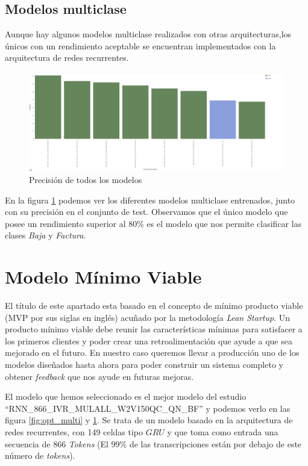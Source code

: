 \subsection{Modelos multiclase}

Aunque hay algunos modelos multiclase realizados con otras arquitecturas,los únicos con un rendimiento aceptable se encuentran implementados con la arquitectura de redes recurrentes.

\begin{figure}[!ht]
	\centering
	\includegraphics[width=1\textwidth]{images/super/resumen_multi}
	\caption{Precisión de todos los modelos}
	\label{fig:resumen_multi}
\end{figure}


En la figura \ref{fig:resumen_multi}  podemos ver los diferentes modelos multiclase entrenados, junto con su precisión en el conjunto de test. Observamos que el único modelo que posee un rendimiento superior al 80\% es el modelo que nos permite clasificar las clases \textit{Baja} y \textit{Factura}.


\section{Modelo Mínimo Viable}
\label{section:super:mvm}
El título de este apartado esta basado en el concepto de mínimo producto viable (MVP por sus siglas en inglés) acuñado por la metodología \textit{Lean Startup}. Un producto mínimo viable debe reunir las características mínimas para satisfacer a los primeros clientes y poder crear una retroalimentación que ayude a que sea mejorado en el futuro. En nuestro caso queremos llevar a producción uno de los modelos diseñados hasta ahora para poder construir un sistema completo y obtener \textit{feedback} que nos ayude en futuras mejoras.

El modelo que hemos seleccionado es el mejor modelo del estudio ``RNN\_866\_IVR\_MULALL\_W2V150QC\_QN\_BF'' y podemos verlo en las figura \ref{fig:opt_multi} y \ref{fig:resumen_multi}. Se trata de un modelo basado en la arquitectura de redes recurrentes, con 149 celdas tipo $GRU$ y que toma como entrada una secuencia de 866 \textit{Tokens} (El 99\% de las transcripciones están por debajo de este número de \textit{tokens}).


